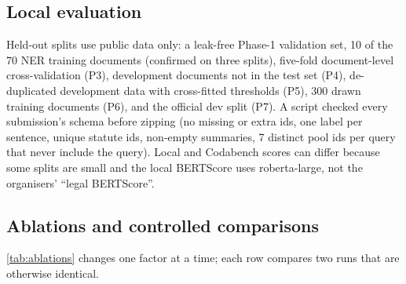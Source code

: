 \documentclass[11pt, oneside]{article}
\begin{document}
\subsection{Local evaluation}\label{sec:localeval}
Held-out splits use public data only: a leak-free Phase-1 validation set, 10 of the 70 NER training documents
(confirmed on three splits), five-fold document-level cross-validation (P3), development documents not in the test
set (P4), de-duplicated development data with cross-fitted thresholds (P5), 300 drawn training documents (P6), and
the official dev split (P7).  A script checked every submission's schema
before zipping (no missing or extra ids, one label per sentence, unique statute ids, non-empty summaries,
7 distinct pool ids per query that never include the query).  Local and Codabench scores can differ because some splits
are small and the local BERTScore uses roberta-large, not the organisers' ``legal BERTScore''.

\subsection{Ablations and controlled comparisons}
\autoref{tab:ablations} changes one factor at a time; each row compares two runs that are otherwise identical.
\end{document}
